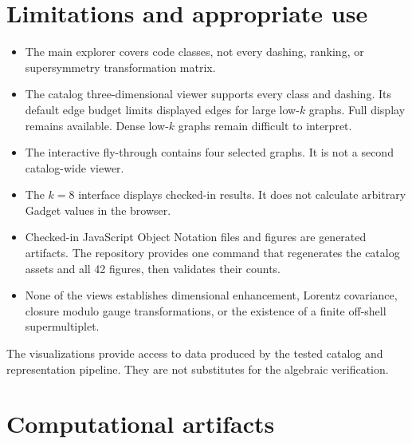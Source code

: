 \documentclass[11pt]{article}
\begin{document}
\section{Limitations and appropriate use}

\begin{itemize}
  \item The main explorer covers code classes, not every dashing, ranking, or
        supersymmetry transformation matrix.
  \item The catalog three-dimensional viewer supports every class and dashing.
        Its default edge budget limits displayed edges for large low-$k$
        graphs.  Full display remains available.  Dense low-$k$ graphs remain
        difficult to interpret.
  \item The interactive fly-through contains four selected graphs.  It is not a
        second catalog-wide viewer.
  \item The $k=8$ interface displays checked-in results.  It does not calculate
        arbitrary Gadget values in the browser.
  \item Checked-in JavaScript Object Notation files and figures are generated
        artifacts.  The repository provides one command that regenerates the
        catalog assets and all 42 figures, then validates their counts.
  \item None of the views establishes dimensional enhancement, Lorentz
        covariance, closure modulo gauge transformations, or the existence of a
        finite off-shell supermultiplet.
\end{itemize}

The visualizations provide access to data produced by the tested catalog and
representation pipeline.  They are not substitutes for the algebraic verification.

\clearpage
\section{Computational artifacts}
\end{document}
